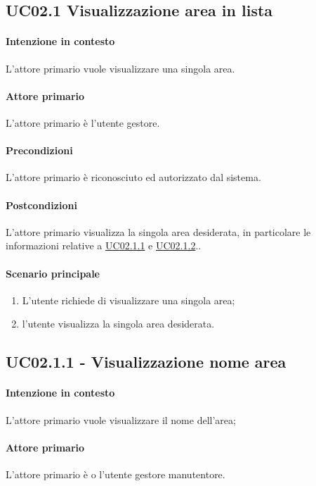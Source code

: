 \subsection{UC02.1 Visualizzazione area in lista}
\paragraph{Intenzione in contesto} L'attore primario vuole visualizzare una singola area.

\paragraph{Attore primario} L'attore primario è l'utente gestore.
\paragraph{Precondizioni}L'attore primario è riconosciuto ed autorizzato dal sistema.
\paragraph{Postcondizioni} L'attore primario visualizza la singola area desiderata, in particolare le informazioni relative a \hyperref[uc:02.1.1]{UC02.1.1} e \hyperref[uc:02.1.2]{UC02.1.2}..

\paragraph{Scenario principale}
\begin{enumerate}
    \item L'utente richiede di visualizzare una singola area;
    \item l'utente visualizza la singola area desiderata.
\end{enumerate}

\subsection{UC02.1.1 - Visualizzazione nome area}\label{uc:02.1.1}

\paragraph{Intenzione in contesto} L'attore primario vuole visualizzare il nome dell'area;
\paragraph{Attore primario} L'attore primario è o l'utente gestore manutentore.
